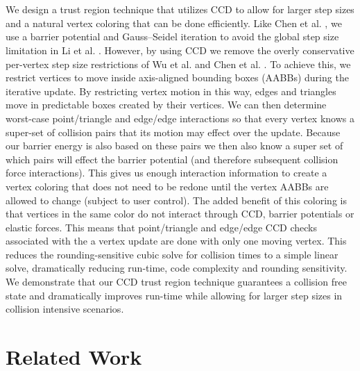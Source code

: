 \documentclass[acmtog,anonymous,review]{acmart}
\begin{document}
\\
\\
We design a trust region technique that utilizes CCD to allow for larger step sizes and a natural vertex coloring that can be done efficiently.
Like Chen et al. , we use a barrier potential and Gauss--Seidel iteration to avoid the global step size limitation in Li et al. .
However, by using CCD we remove the overly conservative per-vertex step size restrictions of Wu et al. and Chen et al. .
To achieve this, we restrict vertices to move inside axis-aligned bounding boxes (AABBs) during the iterative update.
By restricting vertex motion in this way, edges and triangles move in predictable boxes created by their vertices.
We can then determine worst-case point/triangle and edge/edge interactions so that every vertex knows a super-set of collision pairs that its motion may effect over the update.
Because our barrier energy is also based on these pairs we then also know a super set of which pairs will effect the barrier potential (and therefore subsequent collision force interactions).
This gives us enough interaction information to create a vertex coloring that does not need to be redone until the vertex AABBs are allowed to change (subject to user control).
The added benefit of this coloring is that vertices in the same color do not interact through CCD, barrier potentials or elastic forces.
This means that point/triangle and edge/edge CCD checks associated with the a vertex update are done with only one moving vertex.
This reduces the rounding-sensitive cubic solve for collision times to a simple linear solve, dramatically reducing run-time, code complexity and rounding sensitivity.
We demonstrate that our CCD trust region technique guarantees a collision free state and dramatically improves run-time while allowing for larger step sizes in collision intensive scenarios.

\section{Related Work}
\end{document}
